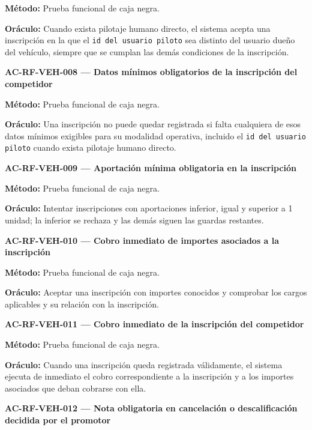 \documentclass[10pt,letterpaper]{article}
\begin{document}
\textbf{Método:} Prueba funcional de caja negra.\par
\textbf{Oráculo:} Cuando exista pilotaje humano directo, el sistema acepta una inscripción en la que el \texttt{id del usuario piloto} sea distinto del usuario dueño del vehículo, siempre que se cumplan las demás condiciones de la inscripción.\par\vspace{0.45em}
\noindent\textbf{AC-RF-VEH-008 --- Datos mínimos obligatorios de la inscripción del competidor}\par
\textbf{Método:} Prueba funcional de caja negra.\par
\textbf{Oráculo:} Una inscripción no puede quedar registrada si falta cualquiera de esos datos mínimos exigibles para su modalidad operativa, incluido el \texttt{id del usuario piloto} cuando exista pilotaje humano directo.\par\vspace{0.45em}
\noindent\textbf{AC-RF-VEH-009 --- Aportación mínima obligatoria en la inscripción}\par
\textbf{Método:} Prueba funcional de caja negra.\par
\textbf{Oráculo:} Intentar inscripciones con aportaciones inferior, igual y superior a 1 unidad; la inferior se rechaza y las demás siguen las guardas restantes.\par\vspace{0.45em}
\noindent\textbf{AC-RF-VEH-010 --- Cobro inmediato de importes asociados a la inscripción}\par
\textbf{Método:} Prueba funcional de caja negra.\par
\textbf{Oráculo:} Aceptar una inscripción con importes conocidos y comprobar los cargos aplicables y su relación con la inscripción.\par\vspace{0.45em}
\noindent\textbf{AC-RF-VEH-011 --- Cobro inmediato de la inscripción del competidor}\par
\textbf{Método:} Prueba funcional de caja negra.\par
\textbf{Oráculo:} Cuando una inscripción queda registrada válidamente, el sistema ejecuta de inmediato el cobro correspondiente a la inscripción y a los importes asociados que deban cobrarse con ella.\par\vspace{0.45em}
\noindent\textbf{AC-RF-VEH-012 --- Nota obligatoria en cancelación o descalificación decidida por el promotor}\par
\end{document}
